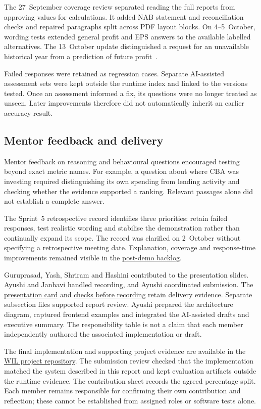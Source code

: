 The 27~September coverage review separated reading the full reports from approving values for calculations. It added NAB statement and reconciliation checks and repaired paragraphs split across PDF layout blocks. On 4--5~October, wording tests extended general profit and EPS answers to the available labelled alternatives. The 13~October update distinguished a request for an unavailable historical year from a prediction of future profit~\cite{fintraceCoverage2026,fintraceBroad2026,fintraceHistory2026}.

Failed responses were retained as regression cases. Separate AI-assisted assessment sets were kept outside the runtime index and linked to the versions tested. Once an assessment informed a fix, its questions were no longer treated as unseen. Later improvements therefore did not automatically inherit an earlier accuracy result.

\subsection{Mentor feedback and delivery}
Mentor feedback on reasoning and behavioural questions encouraged testing beyond exact metric names. For example, a question about where CBA was investing required distinguishing its own spending from lending activity and checking whether the evidence supported a ranking. Relevant passages alone did not establish a complete answer.

The Sprint~5 retrospective record identifies three priorities: retain failed responses, test realistic wording and stabilise the demonstration rather than continually expand its scope. The record was clarified on 2~October without specifying a retrospective meeting date. Explanation, coverage and response-time improvements remained visible in the \href{https://trello.com/c/6hV8pwiq}{post-demo backlog}.

Guruprasad, Yash, Shriram and Hashini contributed to the presentation slides. Ayushi and Janhavi handled recording, and Ayushi coordinated submission. The \href{https://trello.com/c/PA5l3gfM}{presentation card} and \href{https://trello.com/c/aexWs4nM}{checks before recording} retain delivery evidence. Separate subsection files supported report review. Ayushi prepared the architecture diagram, captured frontend examples and integrated the AI-assisted drafts and executive summary. The responsibility table is not a claim that each member independently authored the associated implementation or draft.

The final implementation and supporting project evidence are available in the \href{https://github.com/AyushiNegi20/COSC2669-WIL-PROJECT}{WIL project repository}. The submission review checked that the implementation matched the system described in this report and kept evaluation artifacts outside the runtime evidence. The contribution sheet records the agreed percentage split. Each member remains responsible for confirming their own contribution and reflection; these cannot be established from assigned roles or software tests alone.
